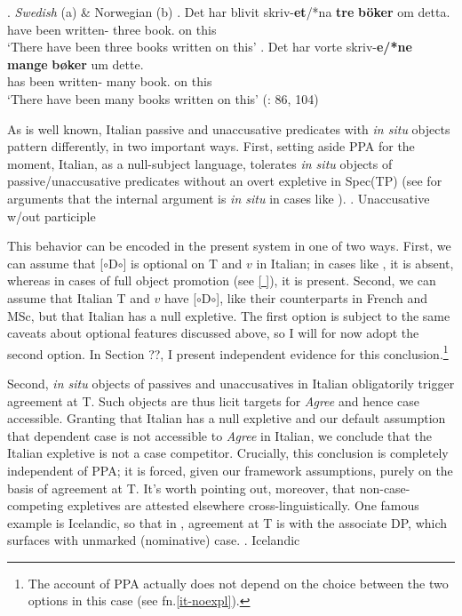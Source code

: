 \documentclass[11pt, letterpaper]{paper_nick}
\newcommand{\fm}[1]{[$\circ$#1$\circ$]}
\begin{document}
\ex. \emph{Swedish} (a) \& Norwegian (b)
\ag. Det har blivit skriv-{\bf et}/*na {\bf tre} {\bf b\"oker} om detta.\\
 have been written- three book. on this\\
`There have been three books written on this'
\bg. Det har vorte skriv-{\bf e/*ne} {\bf mange} {\bf b\o ker} um dette.\\
 has been written- many book. on this\\
`There have been many books written on this'
(\citealt{holmberg01}: 86, 104)


As is well known, Italian passive and unaccusative predicates with \emph{in situ} objects pattern differently, in two important ways. First, setting aside PPA for the moment, Italian, as a null-subject language, tolerates \emph{in situ} objects of passive/unaccusative predicates without an overt expletive in Spec(TP) (see \citealt{rizzi81} for arguments that the internal argument is \emph{in situ} in cases like \Next).
\ex. Unaccusative w/out participle

This behavior can be encoded in the present system in one of two ways. First, we can assume that \fm{D} is optional on T and $v$ in Italian; in cases like \Last, it is absent, whereas in cases of full object promotion (see \ref{ }), it is present. Second, we can assume that Italian T and $v$ have \fm{D}, like their counterparts in French and MSc, but that Italian has a null expletive. The first option is subject to the same caveats about optional features discussed above, so I will for now adopt the second option. In Section ??, I present independent evidence for this conclusion.\footnote{The account of PPA actually does not depend on the choice between the two options in this case (see fn.\ref{it-noexpl}).} 

Second, \emph{in situ} objects of passives and unaccusatives in Italian obligatorily trigger agreement at T. Such objects are thus licit targets for \emph{Agree} and hence case accessible. Granting that Italian has a null expletive and our default assumption that dependent case is not accessible to \emph{Agree} in Italian, we conclude that the Italian expletive is not a case competitor. Crucially, this conclusion is completely independent of PPA; it is forced, given our framework assumptions, purely on the basis of agreement at T. It's worth pointing out, moreover, that non-case-competing expletives are attested elsewhere cross-linguistically. One famous example is Icelandic, so that in \Next, agreement at T is with the associate DP, which surfaces with unmarked (nominative) case. 
\ex. Icelandic
\end{document}
